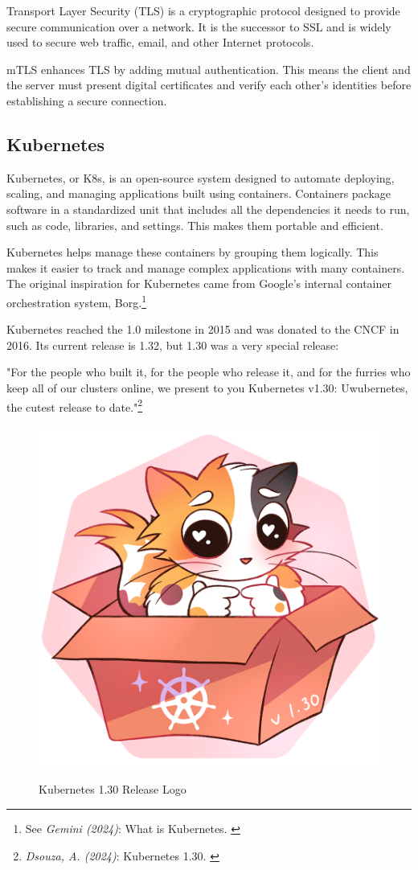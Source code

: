 Transport Layer Security (TLS) is a cryptographic protocol designed to provide secure communication over a network. It is the successor to SSL and is widely used to secure web traffic, email, and other Internet protocols.

mTLS enhances TLS by adding mutual authentication. This means the client and the server must present digital certificates and verify each other's identities before establishing a secure connection.

\subsection{Kubernetes}

Kubernetes, or K8s, is an open-source system designed to automate deploying, scaling, and managing applications built using containers. Containers package software in a standardized unit that includes all the dependencies it needs to run, such as code, libraries, and settings. This makes them portable and efficient.

Kubernetes helps manage these containers by grouping them logically. This makes it easier to track and manage complex applications with many containers. The original inspiration for Kubernetes came from Google's internal container orchestration system, Borg.\footnote{See \textit{Gemini (2024)}: What is Kubernetes. \cite{bardKubernetes}} 

Kubernetes reached the 1.0 milestone in 2015 and was donated to the CNCF in 2016. Its current release is 1.32, but 1.30 was a very special release:

"For the people who built it, for the people who release it, and for the furries who keep all of our clusters online, we present to you Kubernetes v1.30: Uwubernetes, the cutest release to date."\footnote{\textit{Dsouza, A. (2024)}: Kubernetes 1.30. \cite{uwubernetes}}

\begin{figure}[H]
\centering
\caption {Kubernetes 1.30 Release Logo}
\includegraphics[width=0.3\linewidth]{images/k8s-1.30.png}
\label{fig:uwubernetes}
\end{figure}

